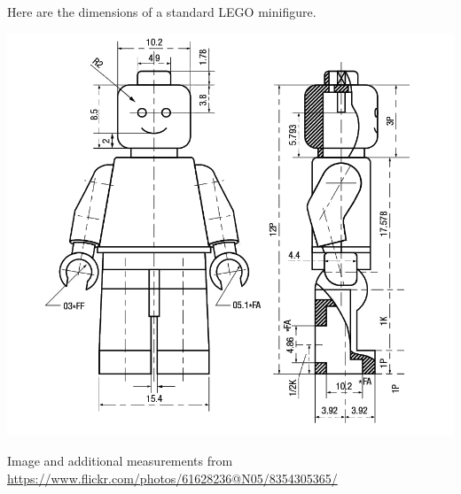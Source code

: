 \documentclass[handout,nooutcomes,noauthor,hints,12pt]{ximera}
\begin{document}
Here are the dimensions of a standard LEGO minifigure. 
\begin{center}
 \includegraphics[height=.5\textheight]{lego-minifigure.png}
\end{center}
Image and additional measurements from
\url{https://www.flickr.com/photos/61628236@N05/8354305365/}
\mynewpage
\end{document}
